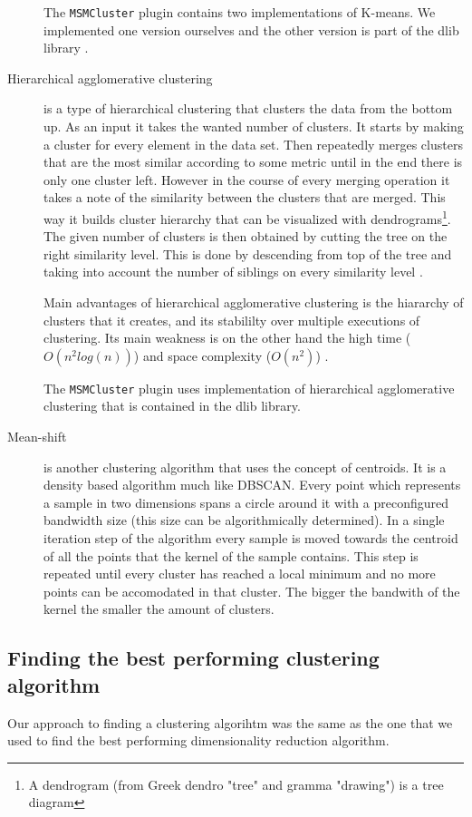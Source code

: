 \documentclass[journal]{vgtc}       %
\begin{document}
\begin{description}
The \verb|MSMCluster| plugin contains two implementations of K-means. We implemented one version ourselves and the other version is part of the dlib library \cite{dlib09}.
\item [Hierarchical agglomerative clustering] is a type of hierarchical clustering that clusters the data from the bottom up. As an input it takes the wanted number of clusters. It starts by making a cluster for every element in the data set. Then repeatedly merges clusters that are the most similar according to some metric until in the end there is only one cluster left. However in the course of every merging operation it takes a note of the similarity between the clusters that are merged. This way it builds cluster hierarchy that can be visualized with dendrograms\footnote{A dendrogram (from Greek dendro "tree" and gramma "drawing") is a tree diagram}. The given number of clusters is then obtained by cutting the tree on the right similarity level. This is done by descending from top of the tree and taking into account the number of siblings on every similarity level \cite{iir}.

Main advantages of hierarchical agglomerative clustering is the hiararchy of clusters that it creates, and its stabililty over multiple executions of clustering. Its main weakness is on the other hand the high time ($O(n^2 log(n))$) and space complexity ($O(n^2)$) \cite{jain1999data}.

The \verb|MSMCluster| plugin uses implementation of hierarchical agglomerative clustering that is contained in the dlib library. 
\item [Mean-shift] is another clustering algorithm that uses the concept of centroids. It is a density based algorithm much like DBSCAN.\cite{dlib09}
Every point which represents a sample in two dimensions spans a circle around it with a preconfigured bandwidth size (this size can be algorithmically determined). In a single iteration step of the algorithm every sample is moved towards the centroid of all the points that the kernel of the sample contains. This step is repeated until every cluster has reached a local minimum and no more points can be accomodated in that cluster. The bigger the bandwith of the kernel the smaller the amount of clusters.  %
\end{description}


\subsection{Finding the best performing clustering algorithm}
Our approach to finding a clustering algorihtm was the same as the one that we used  to find the best performing dimensionality reduction algorithm.
\end{document}
